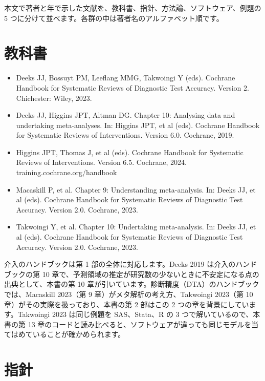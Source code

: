 \begin{chapintro}
本文で著者と年で示した文献を、教科書、指針、方法論、ソフトウェア、例題の 5 つに分けて並べます。各群の中は著者名のアルファベット順です。
\end{chapintro}

\section{教科書}
\label{sec:C-1}

\begin{itemize}
\item Deeks JJ, Bossuyt PM, Leeflang MMG, Takwoingi Y (eds). Cochrane Handbook for Systematic Reviews of Diagnostic Test Accuracy. Version 2. Chichester: Wiley, 2023.
\item Deeks JJ, Higgins JPT, Altman DG. Chapter 10: Analysing data and undertaking meta-analyses. In: Higgins JPT, et al (eds). Cochrane Handbook for Systematic Reviews of Interventions. Version 6.0. Cochrane, 2019.
\item Higgins JPT, Thomas J, et al (eds). Cochrane Handbook for Systematic Reviews of Interventions. Version 6.5. Cochrane, 2024. training.cochrane.org/handbook
\item Macaskill P, et al. Chapter 9: Understanding meta-analysis. In: Deeks JJ, et al (eds). Cochrane Handbook for Systematic Reviews of Diagnostic Test Accuracy. Version 2.0. Cochrane, 2023.
\item Takwoingi Y, et al. Chapter 10: Undertaking meta-analysis. In: Deeks JJ, et al (eds). Cochrane Handbook for Systematic Reviews of Diagnostic Test Accuracy. Version 2.0. Cochrane, 2023.
\end{itemize}

介入のハンドブックは第 1 部の全体に対応します。Deeks 2019 は介入のハンドブックの第 10 章で、予測領域の推定が研究数の少ないときに不安定になる点の出典として、本書の第 10 章が引いています。診断精度（DTA）のハンドブックでは、Macaskill 2023（第 9 章）がメタ解析の考え方、Takwoingi 2023（第 10 章）がその実際を扱っており、本書の第 2 部はこの 2 つの章を背景にしています。Takwoingi 2023 は同じ例題を SAS、Stata、R の 3 つで解いているので、本書の第 13 章のコードと読み比べると、ソフトウェアが違っても同じモデルを当てはめていることが確かめられます。

\section{指針}
\label{sec:C-2}

